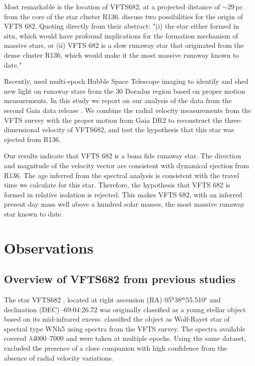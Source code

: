 \documentclass[apjl,twocolumn]{emulateapj}
\begin{document}
Most remarkable is the location of VFTS682, at a projected distance of
$\sim$$29$\,pc from the core of the star cluster
R136. \citet{bestenlehner:11} discuss two possibilities for the
origin of VFTS 682. Quoting directly from their abstract: "(i) the star either formed in situ, which would have profound implications for the formation mechanism of massive stars, or (ii) VFTS 682 is a slow runaway star that originated from the dense cluster R136, which would make it the most massive runaway known to date."

Recently, \citet{platais:15,platais:18} used multi-epoch Hubble Space
Telescope imaging to identify and shed new light on runaway stars from
the 30 Doradus region based on proper motion measurements. In this study we report on our analysis of the data from the second Gaia data release \cite[DR2,][]{gaia:16,brown:18}.  We combine the radial velocity measurements from the VFTS survey \citep[][]{evans:11} with the proper motion from Gaia DR2 to reconstruct the three-dimensional velocity of VFTS682, and test the hypothesis that this star was ejected from R136. 

Our results indicate that VFTS 682 is a bona fide runaway star. The
direction and magnitude of the velocity vector are consistent with
dynamical ejection from R136. The age inferred from the spectral
analysis \citep[from][]{schneider:18} is consistent with the travel
time we calculate for this star. Therefore, the hypothesis that VFTS
682 is formed in relative isolation is rejected.  This makes VFTS 682, with an inferred present day mass well above a hundred solar masses, the most massive runaway star known to date. 


\section{Observations}
\label{sec:sample}

\subsection{ Overview of VFTS682 from previous studies \label{data:vfts683}}

The star VFTS682  \citep{evans:11}, located at right ascension (RA)
05$^\mathrm{h}$38$^\mathrm{m}$55.510$^\mathrm{s}$  and declination
(DEC) -69:04:26.72 \citep[][]{evans:11}
was originally classified as a young stellar object \citep{gruendl:09}
based on its mid-infrared excess.  \citet{evans:11} classified the
object as Wolf-Rayet star of spectral type WNh5 using spectra from the
VFTS survey.  The spectra available covered $\lambda$4000--7000 and
were taken at multiple epochs. Using the same dataset,
\citet{bestenlehner:11} excluded the presence of a close companion
with high confidence from the absence of radial velocity variations.
\end{document}
